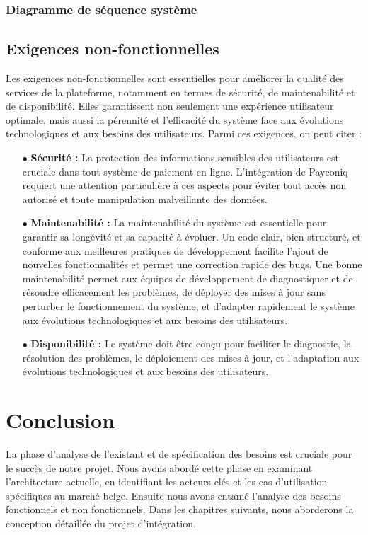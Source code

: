\subsubsection{Diagramme de séquence système}

\subsection{Exigences non-fonctionnelles}

Les exigences non-fonctionnelles sont essentielles pour améliorer la qualité des services de la plateforme, notamment en termes de sécurité, de maintenabilité et de disponibilité. Elles garantissent non seulement une expérience utilisateur optimale, mais aussi la pérennité et l'efficacité du système face aux évolutions technologiques et aux besoins des utilisateurs. Parmi ces exigences, on peut citer :

\begin{itemize}
    \item [$\bullet$]\textbf{Sécurité :} La protection des informations sensibles des utilisateurs est cruciale dans tout système de paiement en ligne. L'intégration de Payconiq requiert une attention particulière à ces aspects pour éviter tout accès non autorisé et toute manipulation malveillante des données.
    \item [$\bullet$]\textbf{Maintenabilité :} La maintenabilité du système est essentielle pour garantir sa longévité et sa capacité à évoluer. Un code clair, bien structuré, et conforme aux meilleures pratiques de développement facilite l'ajout de nouvelles fonctionnalités et permet une correction rapide des bugs. Une bonne maintenabilité permet aux équipes de développement de diagnostiquer et de résoudre efficacement les problèmes, de déployer des mises à jour sans perturber le fonctionnement du système, et d'adapter rapidement le système aux évolutions technologiques et aux besoins des utilisateurs.
    \item [$\bullet$]\textbf{Disponibilité :} Le système doit être conçu pour faciliter le diagnostic, la résolution des problèmes, le déploiement des mises à jour, et l’adaptation aux évolutions technologiques et aux besoins des utilisateurs.
\end{itemize}


\section*{Conclusion}
La phase d'analyse de l'existant et de spécification des besoins est cruciale pour le succès de notre projet. Nous avons abordé cette phase en examinant l'architecture actuelle, en identifiant les acteurs clés et les cas d'utilisation spécifiques au marché belge. Ensuite nous avons entamé l'analyse des besoins fonctionnels et non fonctionnels. Dans les chapitres suivants, nous aborderons la conception détaillée du projet d'intégration.
